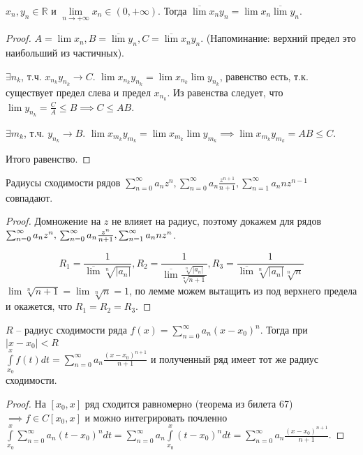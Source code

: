 \begin{lemma} \thmslashn

	$x_n, y_n \in \mathbb{R}$ и $\lim\limits_{n\to+\infty}x_n \in (0, +\infty)$. Тогда $\overline{\lim}x_ny_n = \lim x_n\overline{\lim}y_n$. 
	\begin{proof} \thmslashn
		
		$A = \lim x_n, B = \overline{\lim}y_n, C = \overline{\lim}x_ny_n$. (Напоминание: верхний предел это наибольший из частичных).
		
		$\exists n_k$, т.ч. $x_{n_k}y_{n_k} \to C$. $\lim x_{n_k}y_{n_k} = \lim x_{n_k} \lim y_{n_k}$, равенство есть, т.к. существует предел слева и предел $x_{n_k}$. Из равенства следует, что $\lim y_{n_k} = \frac{C}{A} \leq B \implies C \leq AB$.
		
		$\exists m_k$, т.ч. $y_{n_k} \to B$. $\lim x_{m_k}y_{m_k} = \lim x_{m_k} \lim y_{m_k} \implies \lim x_{m_k}y_{m_k} = AB \leq C$. 
		
		Итого равенство.
	\end{proof}
\end{lemma}

\begin{consequence} \thmslashn

	Радиусы сходимости рядов $\sum_{n = 0}^{\infty}a_nz^n, \sum_{n = 0}^{\infty}a_n\frac{z^{n + 1}}{n + 1}, \sum_{n = 1}^{\infty}a_nnz^{n - 1}$ совпадают.
	\begin{proof} \thmslashn
		
		Домножение на $z$ не влияет на радиус, поэтому докажем для рядов 
		$\sum_{n = 0}^{\infty}a_nz^n,\\ \sum_{n = 0}^{\infty}a_n\frac{z^{n}}{n + 1}, \sum_{n = 1}^{\infty}a_nnz^{n}$.
		
		\[
		R_1 = \frac{1}{\overline{\lim}\sqrt[n]{|a_n|}}, R_2 = \frac{1}{\overline{\lim}\frac{\sqrt[n]{|a_n|}}{\sqrt[n]{n + 1}}}, R_3 = \frac{1}{\overline{\lim}\sqrt[n]{|a_n|}\sqrt[n]{n}}
		\]
		$\lim\sqrt[n]{n + 1} = \lim\sqrt[n]{n} = 1$, по лемме можем вытащить из под верхнего предела и окажется, что $R_1 = R_2 = R_3$.
	\end{proof}
\end{consequence}

\begin{theorem} \thmslashn

$R$ -- радиус сходимости ряда $f(x) = \sum_{n = 0}^{\infty}a_n(x - x_0)^n$. Тогда при $|x - x_0| < R$\\ $\int\limits_{x_0}^{x}f(t)dt = \sum_{n = 0}^{\infty}a_n\frac{(x - x_0)^{n + 1}}{n + 1}$ и полученный ряд имеет тот же радиус сходимости.
\begin{proof} \thmslashn
	
	На $[x_0, x]$ ряд сходится равномерно (теорема из билета 67)$\implies f \in C[x_0, x]$ и можно интегрировать почленно $\int\limits_{x_0}^{x}\sum_{n = 0}^{\infty}a_n(t - x_0)^ndt = \sum_{n = 0}^{\infty}a_n\int\limits_{x_0}^{x}(t - x_0)^ndt = \sum_{n = 0}^{\infty}a_n\frac{(x - x_0)^{n + 1}}{n + 1}$.
\end{proof}
\end{theorem}
